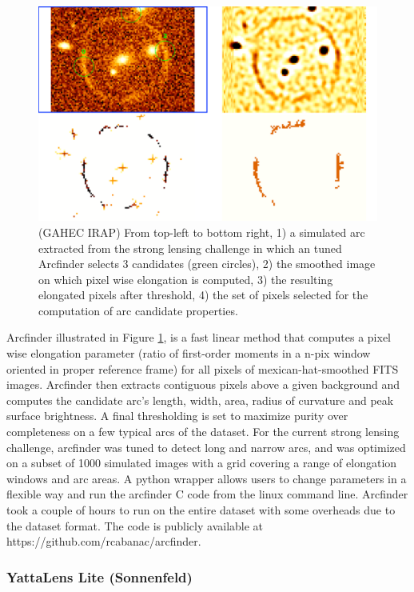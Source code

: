 \documentclass{aa}
\begin{document}
\begin{figure}
 \includegraphics[width=\columnwidth]{figures/arcmethod.pdf}
 \caption{ (GAHEC IRAP) From top-left to bottom right, 1) a simulated arc extracted from the strong lensing challenge in which an tuned Arcfinder selects 3 candidates (green circles), 2) the smoothed image on which pixel wise elongation is computed, 3) the resulting elongated pixels after threshold, 4) the set of pixels selected for the computation of arc candidate properties. }
 \label{fig:Cabanac}
\end{figure}

Arcfinder \citep{2006astro.ph..6757A,2007AandA...461..813C,2012ApJ...749...38M} illustrated in Figure \ref{fig:Cabanac}, is a fast linear method that computes a pixel wise elongation parameter (ratio of first-order moments in a n-pix window oriented in proper reference frame) for all pixels of mexican-hat-smoothed FITS images. Arcfinder then extracts contiguous pixels above a given background and computes the candidate arc's length, width, area, radius of curvature and peak surface brightness. A final thresholding is set to maximize purity over completeness on a few typical arcs of the dataset.
For the current strong lensing challenge, arcfinder was tuned to detect long and narrow arcs, and was optimized on a subset of 1000 simulated images with a grid covering a range of elongation windows and arc areas.  A python wrapper allows users to change parameters in a flexible way and run the arcfinder C code from the linux  command line. Arcfinder took a couple of hours to run on the entire dataset with some overheads due to the dataset format. The code is publicly available at https://github.com/rcabanac/arcfinder.

\subsubsection{YattaLens Lite (Sonnenfeld)}
\label{sec:YettaLens}
\end{document}
